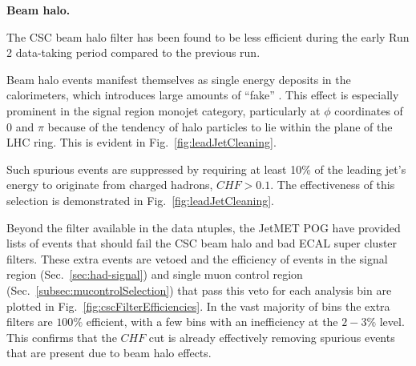 
{\bf Beam halo.}

The CSC beam halo filter has been found to be less efficient during the early
Run 2 data-taking period compared to the previous run.

Beam halo events manifest themselves as single energy deposits in the
calorimeters, which introduces large amounts of ``fake'' \met. This effect is
especially prominent in the signal region monojet category, particularly at
$\phi$ coordinates of 0 and $\pi$ because of the tendency of halo particles to
lie within the plane of the LHC ring. This is evident in
Fig.~\ref{fig:leadJetCleaning}.

Such spurious events are suppressed by requiring at least 10\% of the leading
jet's energy to originate from charged hadrons, $CHF>0.1$. The effectiveness of this selection
is demonstrated in Fig.~\ref{fig:leadJetCleaning}.

Beyond the filter available in the data ntuples, the JetMET POG have
provided lists of events that should fail the CSC beam halo and bad
ECAL super cluster filters. These extra events are vetoed and the
efficiency of events in the signal region (Sec.~\ref{sec:had-signal})
and single muon control region (Sec.~\ref{subsec:mucontrolSelection})
that pass this veto for each analysis bin are plotted in
Fig.~\ref{fig:cscFilterEfficiencies}. In the vast majority of bins the
extra filters are $100\%$ efficient, with a few bins with an
inefficiency at the $2-3\%$ level. This confirms that the $CHF$ cut is
already effectively removing spurious events that are present due to
beam halo effects. 

